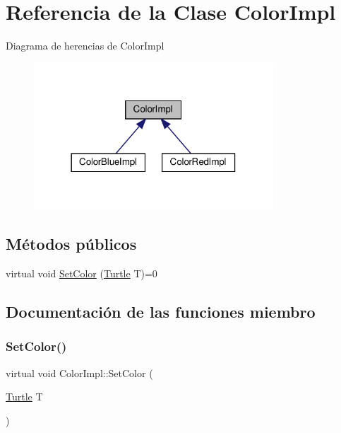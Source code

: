 \hypertarget{classColorImpl}{}\section{Referencia de la Clase Color\+Impl}
\label{classColorImpl}


Diagrama de herencias de Color\+Impl
\nopagebreak
\begin{figure}[H]
\begin{center}
\leavevmode
\includegraphics[width=254pt]{classColorImpl__inherit__graph}
\end{center}
\end{figure}
\subsection*{Métodos públicos}
\begin{DoxyCompactItemize}
\item 
virtual void \hyperlink{classColorImpl_a25bf353d46c94dc280eced8d7d566825}{Set\+Color} (\hyperlink{classTurtle}{Turtle} T)=0
\end{DoxyCompactItemize}


\subsection{Documentación de las funciones miembro}
\mbox{\label{classColorImpl_a25bf353d46c94dc280eced8d7d566825}} 
\subsubsection{\texorpdfstring{Set\+Color()}{SetColor()}}
{\footnotesize\ttfamily virtual void Color\+Impl\+::\+Set\+Color (\begin{DoxyParamCaption}\item[{\hyperlink{classTurtle}{Turtle}}]{T }\end{DoxyParamCaption})\hspace{0.3cm}{\ttfamily [pure virtual]}}

